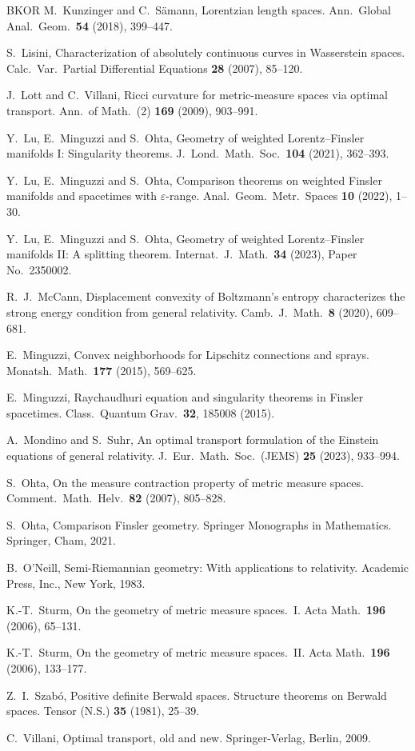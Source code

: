 \documentclass[a4paper,11pt]{article}
\numberwithin{equation}{section}
\theoremstyle{definition}
\theoremstyle{plain}
\let\epsilon\varepsilon
\begin{document}
\begin{thebibliography}{BKOR}
M.~Kunzinger and C.~S\"amann,
Lorentzian length spaces.
Ann.\ Global Anal.\ Geom.\ \textbf{54} (2018), 399--447.

S.~Lisini,
Characterization of absolutely continuous curves in Wasserstein spaces.
Calc.\ Var.\ Partial Differential Equations \textbf{28} (2007), 85--120.

J.~Lott and C.~Villani,
Ricci curvature for metric-measure spaces via optimal transport.
Ann.\ of Math.\ (2) \textbf{169} (2009), 903--991.

Y.~Lu, E.~Minguzzi and S.~Ohta,
Geometry of weighted Lorentz--Finsler manifolds I: Singularity theorems.
J.\ Lond.\ Math.\ Soc.\ \textbf{104} (2021), 362--393.

Y.~Lu, E.~Minguzzi and S.~Ohta,
Comparison theorems on weighted Finsler manifolds and spacetimes with $\epsilon$-range.
Anal.\ Geom.\ Metr.\ Spaces \textbf{10} (2022), 1--30.

Y.~Lu, E.~Minguzzi and S.~Ohta,
Geometry of weighted Lorentz--Finsler manifolds II: A splitting theorem.
Internat.\ J.\ Math.\ \textbf{34} (2023), Paper No.~2350002.

R.~J.~McCann,
Displacement convexity of Boltzmann's entropy characterizes the strong energy condition from general relativity.
Camb.\ J.\ Math.\ \textbf{8} (2020), 609--681.

E.~Minguzzi,
Convex neighborhoods for Lipschitz connections and sprays.
Monatsh.\ Math.\ \textbf{177} (2015), 569--625.

E.~Minguzzi,
Raychaudhuri equation and singularity theorems in Finsler spacetimes.
Class.\ Quantum Grav.\ \textbf{32}, 185008 (2015).

A.~Mondino and S.~Suhr,
An optimal transport formulation of the Einstein equations of general relativity.
J.\ Eur.\ Math.\ Soc.\ (JEMS) \textbf{25} (2023), 933--994.

S.~Ohta,
On the measure contraction property of metric measure spaces.
Comment.\ Math.\ Helv.\ \textbf{82} (2007), 805--828.

S.~Ohta, Comparison Finsler geometry.
Springer Monographs in Mathematics.
Springer, Cham, 2021.

B.~O'Neill, Semi-Riemannian geometry: With applications to relativity.
Academic Press, Inc., New York, 1983.

K.-T.~Sturm,
On the geometry of metric measure spaces.~I.
Acta Math.\ {\bf 196} (2006), 65--131.

K.-T.~Sturm,
On the geometry of metric measure spaces.~II.
Acta Math.\ {\bf 196} (2006), 133--177.

Z.~I.~Szab\'o,
Positive definite Berwald spaces. Structure theorems on Berwald spaces.
Tensor (N.S.) \textbf{35} (1981), 25--39.

C.~Villani,
Optimal transport, old and new.
Springer-Verlag, Berlin, 2009.
\end{thebibliography}
\end{document}

